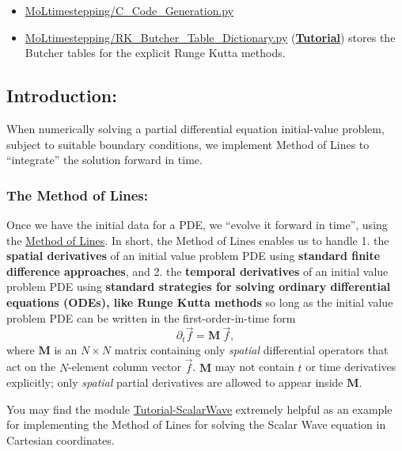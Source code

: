 \documentclass[landscape,letterpaper,10pt,english]{article}
\providecommand{\tightlist}{%
      \setlength{\itemsep}{0pt}\setlength{\parskip}{0pt}}
\begin{document}
\begin{itemize}
\tightlist
\item
  \href{../edit/MoLtimestepping/C_Code_Generation.py}{MoLtimestepping/C\_Code\_Generation.py}
\item
  \href{../edit/MoLtimestepping/RK_Butcher_Table_Dictionary.py}{MoLtimestepping/RK\_Butcher\_Table\_Dictionary.py}
  (\href{Tutorial-RK_Butcher_Table_Dictionary.ipynb}{\textbf{Tutorial}})
  stores the Butcher tables for the explicit Runge Kutta methods.
\end{itemize}

\hypertarget{introduction}{%
\subsection{Introduction:}\label{introduction}}

When numerically solving a partial differential equation initial-value
problem, subject to suitable boundary conditions, we implement Method of
Lines to ``integrate'' the solution forward in time.

\hypertarget{the-method-of-lines}{%
\subsubsection{The Method of Lines:}\label{the-method-of-lines}}

Once we have the initial data for a PDE, we ``evolve it forward in
time'', using the
\href{https://reference.wolfram.com/language/tutorial/NDSolveMethodOfLines.html}{Method
of Lines}. In short, the Method of Lines enables us to handle 1. the
\textbf{spatial derivatives} of an initial value problem PDE using
\textbf{standard finite difference approaches}, and 2. the
\textbf{temporal derivatives} of an initial value problem PDE using
\textbf{standard strategies for solving ordinary differential equations
(ODEs), like Runge Kutta methods} so long as the initial value problem
PDE can be written in the first-order-in-time form
\[\partial_t \vec{f} = \mathbf{M}\ \vec{f},\] where \(\mathbf{M}\) is an
\(N\times N\) matrix containing only \emph{spatial} differential
operators that act on the \(N\)-element column vector \(\vec{f}\).
\(\mathbf{M}\) may not contain \(t\) or time derivatives explicitly;
only \emph{spatial} partial derivatives are allowed to appear inside
\(\mathbf{M}\).

You may find the module
\href{Tutorial-ScalarWave.ipynb}{Tutorial-ScalarWave} extremely helpful
as an example for implementing the Method of Lines for solving the
Scalar Wave equation in Cartesian coordinates.
\end{document}

